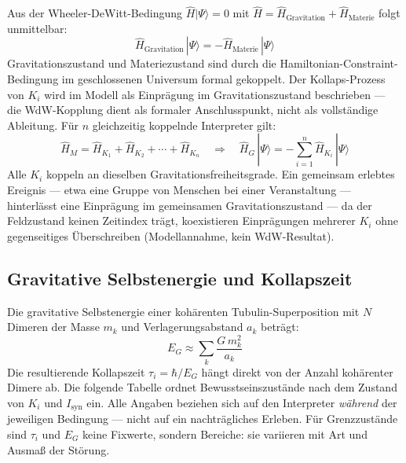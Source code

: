 \documentclass[11pt,a4paper]{article}
\begin{document}
Aus der Wheeler-DeWitt-Bedingung $\hat{H}|\Psi\rangle = 0$ mit
$\hat{H} = \hat{H}_{\text{Gravitation}} + \hat{H}_{\text{Materie}}$ folgt
unmittelbar:
\begin{equation}
  \hat{H}_{\text{Gravitation}}\,|\Psi\rangle = -\hat{H}_{\text{Materie}}\,|\Psi\rangle
  \label{eq:wdw_coupling}
\end{equation}
Gravitationszustand und Materiezustand sind durch die Hamiltonian-Constraint-Bedingung
im geschlossenen Universum formal gekoppelt. Der Kollaps-Prozess von $K_i$ wird im Modell als Einprägung im Gravitationszustand beschrieben —
die WdW-Kopplung dient als formaler Anschlusspunkt, nicht als vollständige Ableitung. Für $n$ gleichzeitig koppelnde Interpreter gilt:
\begin{equation}
  \hat{H}_M = \hat{H}_{K_1} + \hat{H}_{K_2} + \cdots + \hat{H}_{K_n}
  \quad\Rightarrow\quad
  \hat{H}_G\,|\Psi\rangle = -\sum_{i=1}^n \hat{H}_{K_i}\,|\Psi\rangle
\end{equation}
Alle $K_i$ koppeln an dieselben Gravitationsfreiheitsgrade. Ein gemeinsam
erlebtes Ereignis — etwa eine Gruppe von Menschen bei einer Veranstaltung —
hinterlässt eine Einprägung im gemeinsamen Gravitationszustand — da der
Feldzustand keinen Zeitindex trägt, koexistieren Einprägungen mehrerer $K_i$
ohne gegenseitiges Überschreiben (Modellannahme, kein WdW-Resultat).

\subsection*{Gravitative Selbstenergie und Kollapszeit}

Die gravitative Selbstenergie einer kohärenten Tubulin-Superposition mit
$N$ Dimeren der Masse $m_k$ und Verlagerungsabstand $a_k$ beträgt:
\begin{equation}
  E_G \approx \sum_k \frac{G\,m_k^2}{a_k}
  \label{eq:eg}
\end{equation}
Die resultierende Kollapszeit $\tau_i = \hbar/E_G$ hängt direkt von der
Anzahl kohärenter Dimere ab. Die folgende Tabelle ordnet Bewusstseinszustände
nach dem Zustand von $K_i$ und $I_{\mathrm{syn}}$ ein. Alle Angaben beziehen
sich auf den Interpreter \emph{während} der jeweiligen Bedingung — nicht auf
ein nachträgliches Erleben. Für Grenzzustände sind $\tau_i$ und $E_G$ keine
Fixwerte, sondern Bereiche: sie variieren mit Art und Ausmaß der Störung.
\end{document}
